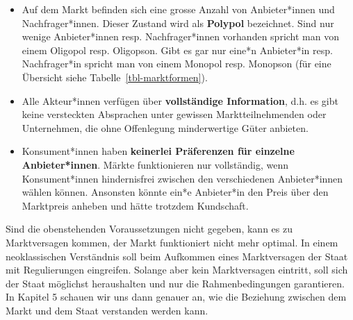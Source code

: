 \documentclass[
  nswissgerman,
  a4paper,
  DIV=11,
  numbers=noendperiod,
  oneside,
  openany]{scrreprt}
\providecommand{\tightlist}{%
  \setlength{\itemsep}{0pt}\setlength{\parskip}{0pt}}
\begin{document}
\begin{itemize}
\tightlist
\item
  Auf dem Markt befinden sich eine grosse Anzahl von Anbieter*innen und
  Nachfrager*innen. Dieser Zustand wird als \textbf{Polypol} bezeichnet.
  Sind nur wenige Anbieter*innen resp. Nachfrager*innen vorhanden
  spricht man von einem Oligopol resp. Oligopson. Gibt es gar nur eine*n
  Anbieter*in resp. Nachfrager*in spricht man von einem Monopol resp.
  Monopson (für eine Übersicht siehe Tabelle~\ref{tbl-marktformen}).
\item
  Alle Akteur*innen verfügen über \textbf{vollständige Information},
  d.h. es gibt keine versteckten Absprachen unter gewissen
  Marktteilnehmenden oder Unternehmen, die ohne Offenlegung
  minderwertige Güter anbieten.
\item
  Konsument*innen haben \textbf{keinerlei Präferenzen für einzelne
  Anbieter*innen}. Märkte funktionieren nur vollständig, wenn
  Konsument*innen hindernisfrei zwischen den verschiedenen
  Anbieter*innen wählen können. Ansonsten könnte ein*e Anbieter*in den
  Preis über den Marktpreis anheben und hätte trotzdem Kundschaft.
\end{itemize}

Sind die obenstehenden Voraussetzungen nicht gegeben, kann es zu
Marktversagen kommen, der Markt funktioniert nicht mehr optimal. In
einem neoklassischen Verständnis soll beim Aufkommen eines Marktversagen
der Staat mit Regulierungen eingreifen. Solange aber kein Marktversagen
eintritt, soll sich der Staat möglichst heraushalten und nur die
Rahmenbedingungen garantieren. In Kapitel 5 schauen wir uns dann genauer
an, wie die Beziehung zwischen dem Markt und dem Staat verstanden werden
kann.
\end{document}
